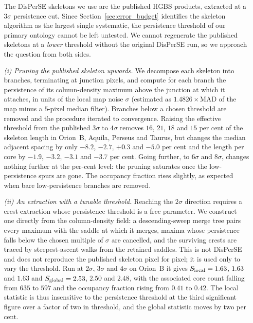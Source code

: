 \documentclass[usenatbib,twoside,twocolumn]{mnras}
\begin{document}
The DisPerSE skeletons we use are the published HGBS products, extracted at a $3\sigma$ persistence cut. Since Section~\ref{sec:error_budget} identifies the skeleton algorithm as the largest single systematic, the persistence threshold of our primary ontology cannot be left untested. We cannot regenerate the published skeletons at a \emph{lower} threshold without the original DisPerSE run, so we approach the question from both sides.

\smallskip\noindent\emph{(i) Pruning the published skeleton upwards.} We decompose each skeleton into branches, terminating at junction pixels, and compute for each branch the persistence of its column-density maximum above the junction at which it attaches, in units of the local map noise $\sigma$ (estimated as $1.4826\times$MAD of the map minus a $5$-pixel median filter). Branches below a chosen threshold are removed and the procedure iterated to convergence. Raising the effective threshold from the published $3\sigma$ to $4\sigma$ removes $16$, $21$, $18$ and $15$ per cent of the skeleton length in Orion~B, Aquila, Perseus and Taurus, but changes the median adjacent spacing by only $-8.2$, $-2.7$, $+0.3$ and $-5.0$ per cent and the length per core by $-1.9$, $-3.2$, $-3.1$ and $-3.7$ per cent. Going further, to $6\sigma$ and $8\sigma$, changes nothing further at the per-cent level: the pruning saturates once the low-persistence spurs are gone. The occupancy fraction rises slightly, as expected when bare low-persistence branches are removed.

\smallskip\noindent\emph{(ii) An extraction with a tunable threshold.} Reaching the $2\sigma$ direction requires a crest extraction whose persistence threshold is a free parameter. We construct one directly from the column-density field: a descending-sweep merge tree pairs every maximum with the saddle at which it merges, maxima whose persistence falls below the chosen multiple of $\sigma$ are cancelled, and the surviving crests are traced by steepest-ascent walks from the retained saddles. This is not DisPerSE and does not reproduce the published skeleton pixel for pixel; it is used only to vary the threshold. Run at $2\sigma$, $3\sigma$ and $4\sigma$ on Orion~B it gives $S_{\rm local}=1.63$, $1.63$ and $1.63$ and $S_{\rm global}=2.53$, $2.50$ and $2.48$, with the associated core count falling from $635$ to $597$ and the occupancy fraction rising from $0.41$ to $0.42$. The local statistic is thus insensitive to the persistence threshold at the third significant figure over a factor of two in threshold, and the global statistic moves by two per cent.
\end{document}
